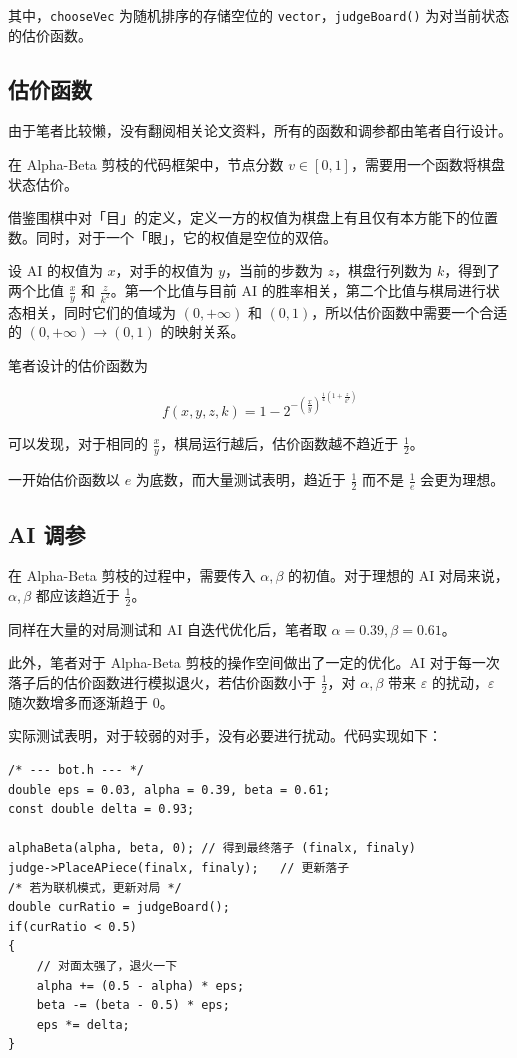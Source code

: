 \documentclass{noithesis}
\begin{document}
	其中，\verb|chooseVec| 为随机排序的存储空位的 \verb|vector|，\verb|judgeBoard()| 为对当前状态的估价函数。

	\subsection{估价函数}
	
	由于笔者比较懒，没有翻阅相关论文资料，所有的函数和调参都由笔者自行设计。
	
	在 Alpha-Beta 剪枝的代码框架中，节点分数 $v \in [0, 1]$，需要用一个函数将棋盘状态估价。
	
	借鉴围棋中对「目」的定义，定义一方的权值为棋盘上有且仅有本方能下的位置数。同时，对于一个「眼」，它的权值是空位的双倍。
	
	设 AI 的权值为 $x$，对手的权值为 $y$，当前的步数为 $z$，棋盘行列数为 $k$，得到了两个比值 $\frac xy$ 和 $\frac z{k^2}$。第一个比值与目前 AI 的胜率相关，第二个比值与棋局进行状态相关，同时它们的值域为 $(0,+\infty)$ 和 $(0,1)$，所以估价函数中需要一个合适的 $(0, +\infty) \to (0, 1)$ 的映射关系。
	
	笔者设计的估价函数为
	
	\begin{displaymath}
		f(x, y, z, k) = 1 - 2 ^ {-(\frac xy) ^ {\frac 14 \left(1+\frac{z}{k^2}\right)}} 
	\end{displaymath}

	可以发现，对于相同的 $\frac xy$，棋局运行越后，估价函数越不趋近于 $\frac 12$。
	
	一开始估价函数以 $e$ 为底数，而大量测试表明，趋近于 $\frac 12$ 而不是 $\frac 1e$ 会更为理想。
		
	\subsection{AI 调参}
	
	在 Alpha-Beta 剪枝的过程中，需要传入 $\alpha, \beta$ 的初值。对于理想的 AI 对局来说，$\alpha, \beta$ 都应该趋近于 $\frac 12$。
	
	同样在大量的对局测试和 AI 自迭代优化后，笔者取 $\alpha = 0.39,\beta = 0.61$。
	
	此外，笔者对于 Alpha-Beta 剪枝的操作空间做出了一定的优化。AI 对于每一次落子后的估价函数进行模拟退火，若估价函数小于 $\frac 12$，对 $\alpha, \beta$ 带来 $\varepsilon$ 的扰动，$\varepsilon$ 随次数增多而逐渐趋于 $0$。
	
	实际测试表明，对于较弱的对手，没有必要进行扰动。代码实现如下：
	
	\begin{lstlisting}
/* --- bot.h --- */
double eps = 0.03, alpha = 0.39, beta = 0.61;
const double delta = 0.93;

alphaBeta(alpha, beta, 0); // 得到最终落子 (finalx, finaly)
judge->PlaceAPiece(finalx, finaly);   // 更新落子
/* 若为联机模式，更新对局 */
double curRatio = judgeBoard();
if(curRatio < 0.5)
{
	// 对面太强了，退火一下
	alpha += (0.5 - alpha) * eps;
	beta -= (beta - 0.5) * eps;
	eps *= delta;
}
	\end{lstlisting}
		
\end{document}
